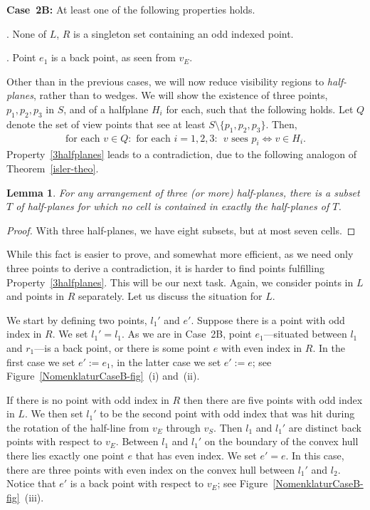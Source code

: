 \documentclass[11pt]{article}
\newtheorem{lemma}{Lemma}
\begin{document}
{\bf Case~2B:  } At least one of the following properties holds.

. None of $L$, $R$ is a singleton set containing an odd indexed point.

. Point $e_1$ is a back point, as seen from $v_E$.

\medskip
Other than in the previous cases, we will now reduce visibility regions to {\em half-planes}, rather than to wedges.
We will show the existence of three points, $p_1, p_2, p_3$ in $S$, and of a halfplane $H_{i}$ 
for each, such that the following holds. 
Let $Q$ denote the set of view points that see at least $S \setminus \{p_1,p_2,p_3 \}$.
Then,
\begin{eqnarray}     \label{3halfplanes}
       \mbox{for each }  v \in Q:  \mbox{ for each } i = 1,2,3: \ \       v  \mbox{ sees } p_i  \Longleftrightarrow     v\in H_{i}.
\end{eqnarray}
Property~\ref{3halfplanes} leads to a contradiction, due to the following analogon of Theorem~\ref{isler-theo}.

\begin{lemma}     \label{isler-lem}
For any arrangement of three (or more) half-planes, there is a subset $T$ of half-planes for which no cell
is contained in exactly the half-planes of $T$.
\end{lemma}
\begin{proof}
With three half-planes, we have eight subsets, but at most seven cells.
\end{proof}
While this fact is easier to prove, and somewhat more efficient, as we need only three points to derive a contradiction, 
it is harder to find points fulfilling Property~\ref{3halfplanes}. This will be our next task.
Again, we consider points in $L$ and points in $R$ separately. Let us discuss the situation for $L$.

We start by defining two points, $l_1'$ and $e'$. 
Suppose there is a point with odd index in $R$. We set $l_1'=l_1$. 
As we are in Case~2B, point $e_1$---situated between $l_1$ and $r_1$---is a back point,
or there is some point $e$ with even index in $R$. 
In the first case we set $e':=e_1$, in the latter case we set $e':=e$; see Figure~\ref{NomenklaturCaseB-fig}~(i) and~(ii).

If there is no point with odd index in $R$ then there are five points with odd index in $L$. We then set $l_1'$ to be the second point with 
odd index that was hit during the rotation of the half-line from $v_E$ through $v_S$. 
Then $l_1$ and $l_1'$  are distinct back points with respect to $v_E$. 
Between $l_1$ and $l_1'$ on the boundary of the convex hull there lies exactly one point $e$ that has even index. We set $e'=e$.
In this case, there are three points with even index on the convex hull between $l_1'$ and $l_2$.
Notice that $e'$ is a back point with respect to $v_E$; see Figure~\ref{NomenklaturCaseB-fig}~(iii).
\end{document}
